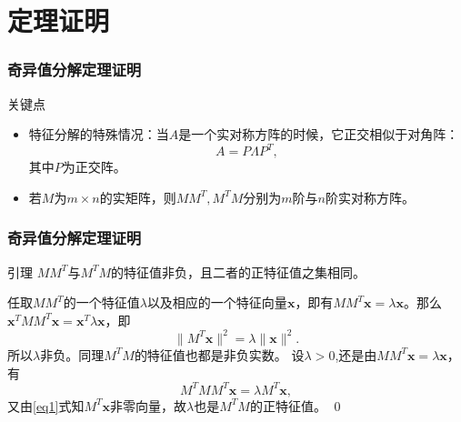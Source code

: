 
\section{定理证明}


\begin{frame}
\frametitle{奇异值分解定理证明}

\begin{block}{关键点}
\begin{itemize}
\item<2-> 特征分解的特殊情况：当$A$是一个实对称方阵的时候，它正交相似于对角阵：
\[A = P\Lambda P^T,\]
其中$P$为正交阵。
\vspace{1em}
\item<3-> 若$M$为$m\times n$的实矩阵，则$MM^T, M^TM$分别为$m$阶与$n$阶实对称方阵。
\end{itemize}
\end{block}

\end{frame}



\begin{frame}
\frametitle{奇异值分解定理证明}

\begin{block}{引理}
\centering
$MM^T$与$M^TM$的特征值非负，且二者的正特征值之集相同。
\end{block}

\pause

\startproof[bg=yellow, fg=red]
任取$MM^T$的一个特征值$\lambda$以及相应的一个特征向量$\mathbf{x}$，即有$MM^T\mathbf{x} = \lambda\mathbf{x}$。那么$\mathbf{x}^TMM^T\mathbf{x} = \mathbf{x}^T\lambda\mathbf{x}$，即
\begin{equation}
\label{eq1}
\lVert M^T\mathbf{x} \rVert^2 = \lambda \lVert \mathbf{x} \rVert^2.
\end{equation}
所以$\lambda$非负。同理$M^TM$的特征值也都是非负实数。\newline\pause
设$\lambda > 0$,还是由$MM^T\mathbf{x} = \lambda\mathbf{x}$，有
\begin{equation}
\label{eq2}
M^TMM^T\mathbf{x} = \lambda M^T\mathbf{x},
\end{equation}
又由\eqref{eq1}式知$M^T\mathbf{x}$非零向量，故$\lambda$也是$M^TM$的正特征值。
\qed

\end{frame}

